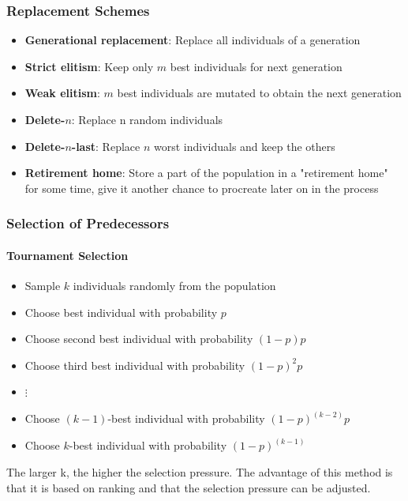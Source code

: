 \documentclass[11pt]{article}
\begin{document}
\subsubsection{Replacement Schemes}

\begin{itemize}
	\item \textbf{Generational replacement}: Replace all individuals of a generation
	\item \textbf{Strict elitism}: Keep only $m$ best individuals for next generation
	\item \textbf{Weak elitism}: $m$ best individuals are mutated to obtain the next generation
	\item \textbf{Delete-$n$}: Replace n random individuals 
	\item \textbf{Delete-$n$-last}: Replace $n$ worst individuals and keep the others
	\item \textbf{Retirement home}: Store a part of the population in a "retirement home" for some time, give it another chance to procreate later on in the process
\end{itemize}

\subsubsection{Selection of Predecessors}
\paragraph{Tournament Selection}
\begin{itemize}[label=]
	\item Sample $k$ individuals randomly from the population
	\item Choose best individual with probability $p$
	\item Choose second best individual with probability $(1-p)p$
	\item Choose third best individual with probability $(1-p)^2p$
	\item \quad $\vdots$
	\item Choose $(k-1)$-best individual with probability $(1-p)^{(k-2)}p$
	\item Choose $k$-best individual with probability $(1-p)^{(k-1)}$
\end{itemize}

The larger k, the higher the selection pressure. The advantage of this method is that it is based on ranking and that the selection pressure can be adjusted.
\end{document}
